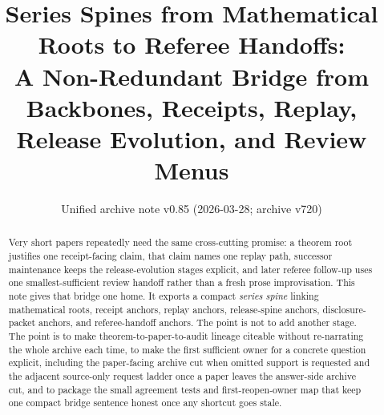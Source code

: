 \documentclass[11pt]{article}
\title{Series Spines from Mathematical Roots to Referee Handoffs:\\[0.5ex]
\large A Non-Redundant Bridge from Backbones, Receipts, Replay, Release Evolution, and Review Menus}
\author{}
\date{Unified archive note v0.85 (2026-03-28; archive v720)}
\begin{document}
\maketitle

\begin{abstract}
Very short papers repeatedly need the same cross-cutting promise: a theorem root justifies one receipt-facing claim, that claim names one replay path, successor maintenance keeps the release-evolution stages explicit, and later referee follow-up uses one smallest-sufficient review handoff rather than a fresh prose improvisation.
This note gives that bridge one home.
It exports a compact \emph{series spine} linking mathematical roots, receipt anchors, replay anchors, release-spine anchors, disclosure-packet anchors, and referee-handoff anchors.
The point is not to add another stage.
The point is to make theorem-to-paper-to-audit lineage citeable without re-narrating the whole archive each time, to make the first sufficient owner for a concrete question explicit, including the paper-facing archive cut when omitted support is requested and the adjacent source-only request ladder once a paper leaves the answer-side archive cut, and to package the small agreement tests and first-reopen-owner map that keep one compact bridge sentence honest once any shortcut goes stale.
\end{abstract}
\end{document}
